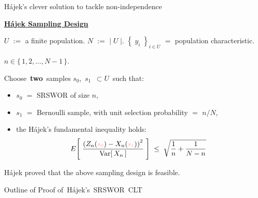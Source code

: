 \begin{frame}{\Huge H\'{a}jek's clever solution to tackle non-independence}

\pause
\begin{center}
\textbf{\underline{\LARGE H\'{a}jek Sampling Design}}

\pause
\vskip 0.3cm
{\scriptsize
$U$ \;$:=$\; a finite population.
\;
$N$ \;$:=$\; $\vert\;U\;\vert$.
\;
$\left\{\;y_{i}\;\right\}_{i \in U}$ \;$=$\; population characteristic.

$n \in \{\,1,2,\ldots,N-1\,\}$.
}
\end{center}

\pause
\vskip -0.3cm
Choose \,\textbf{\color{red}two}\, samples $s_{0}$,\, $s_{1}$ \,$\subset U$\, such that:
\begin{itemize}
\pause
\item	$s_{0}$ \;$=$\; SRSWOR of size $n$,
\pause
\item	$s_{1}$ \;$=$\; {\color{red}Bernoulli} sample, with unit selection probability $=$ $n/N$,
\pause
\item	the {\color{red}H\'{a}jek's fundamental inequality} holds:
\pause
		{\scriptsize
		\vskip -0.1cm
		\begin{equation*}
		E\!\left[\;\dfrac{\left(Z_{n}({\color{faintred}s_{0}}) - X_{n}({\color{faintred}s_{1}})\right)^{2}}{\Var\!\left[\,X_{n}\,\right]}\;\right]
		\;\leq\;
		\sqrt{\dfrac{1}{n} + \dfrac{1}{N-n}}
		\end{equation*}
		}
\end{itemize}

\pause
\begin{center}
\vskip 0.0cm
{\small\color{gcblue}H\'{a}jek proved that the above sampling design is feasible.}
\end{center}

\end{frame}

\begin{frame}{\Large Outline of Proof of \LARGE \,H\'{a}jek's \,SRSWOR\, CLT}

\begin{center}
\vskip -0.75cm

\end{center}

\end{frame}

